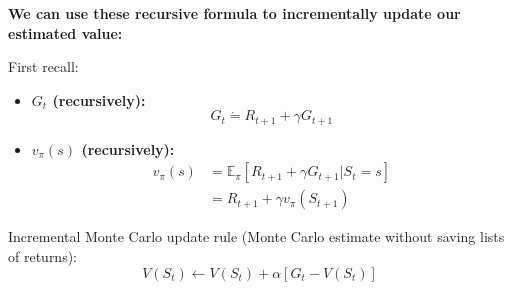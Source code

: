 \documentclass[12pt, a4paper]{article}
\begin{document}
\textbf{We can use these recursive formula to incrementally update our estimated value:}

First recall:
\begin{itemize}
  \item \textbf{$G_t$ (recursively):}
  $$
  G_t \dot{=} R_{t+1} + \gamma G_{t+1}
  $$
  \item \textbf{$v_\pi(s)$ (recursively):}
    \begin{align*}
    v_\pi(s) &= \mathbb{E}_\pi[R_{t+1} + \gamma G_{t+1}|S_t=s] \\
    &= R_{t+1} + \gamma v_\pi(S_{t+1})
    \end{align*}
\end{itemize}

Incremental Monte Carlo update rule (Monte Carlo estimate without saving lists of returns):
$$V(S_t) \leftarrow V(S_t) + \alpha [G_t - V(S_t)]$$
\end{document}
